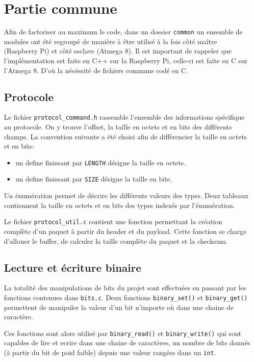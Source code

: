 \section{Partie commune}
Afin de factoriser au maximum le code, dans un dossier \texttt{common} un ensemble de modules ont été regroupé de manière à être utilisé à la fois côté maître (Raspberry Pi) et côté esclave (Atmega 8).
Il est important de rappeler que l'implémentation est faite en C++ sur la Raspberry Pi, celle-ci est faite en C sur l'Atmega 8. D'où la nécéssité de fichiers communs codé en C.

\subsection{Protocole}
Le fichier \texttt{protocol\_command.h} rassemble l'ensemble des informations spécifique au protocole. 
On y trouve l'offset, la taille en octets et en bits des différents champs.
La convention suivante a été choisi afin de différencier la taille en octets et en bits:
\begin{itemize}
\item un define finissant par \texttt{LENGTH} désigne la taille en octets.
\item un define finissant par \texttt{SIZE} désigne la taille en bits.
\end{itemize}

Un énumération permet de décrire les différents valeurs des types.
Deux tableaux contiennent la taille en octets et en bits des types indexés par l'énumération.


Le fichier \texttt{protocol\_util.c} contient une fonction permettant la création complète d'un paquet à partir du header et du payload.
Cette fonction se charge d'allouer le buffer, de calculer la taille complète du paquet et la checksum.

\subsection{Lecture et écriture binaire}
La totalité des manipulations de bits du projet sont effectuées en passant par les fonctions contenues dans \texttt{bits.c}. Deux fonctions \texttt{binary\_set()} et \texttt{binary\_get()} permettent de manipuler la valeur d'un bit n'importe où dans une chaine de caractère.


Ces fonctions sont alors utilisé par \texttt{binary\_read()} et \texttt{binary\_write()} qui sont capables de lire et ecrire dans une chaine de caractères, un nombre de bits donnés (à partir du bit de poid faible) depuis une valeur rangées dans un \texttt{int}.

